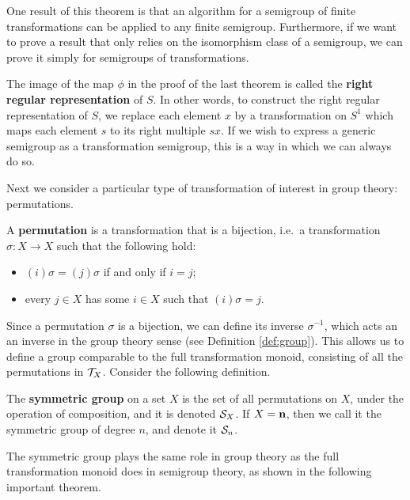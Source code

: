 One result of this theorem is that an algorithm for a semigroup of finite transformations
can be applied to any finite semigroup.  Furthermore, if we want to prove a result that
only relies on the isomorphism class of a semigroup, we can prove it simply for
semigroups of transformations.

The image of the map $\phi$ in the proof of the last theorem is called the
\textbf{right regular representation} of $S$.  In other words, to construct the
right regular representation of $S$, we replace each element $x$ by a
transformation on $S^1$ which maps each element $s$ to its right multiple $sx$.
If we wish to express a generic semigroup as a transformation semigroup, this is
a way in which we can always do so.

Next we consider a particular type of transformation of interest in group
theory: permutations.

\begin{definition}
  \label{def:permutation}
  A \textbf{permutation} is a transformation that is a bijection, i.e.~a
  transformation $\sigma: X \to X$ such that the following hold:
  \begin{itemize}
  \item $(i)\sigma=(j)\sigma$ if and only if $i=j$;
  \item every $j \in X$ has some $i \in X$ such that $(i)\sigma = j$.
  \end{itemize}
\end{definition}

Since a permutation $\sigma$ is a bijection, we can define its inverse
$\sigma^{-1}$, which acts an an inverse in the group theory sense (see
Definition \ref{def:group}).  This allows us to define a group comparable to the
full transformation monoid, consisting of all the permutations in $\mathcal{T}_X$.
Consider the following definition.

\begin{definition}
  \label{def:sn}
  The \textbf{symmetric group} on a set $X$ is the set of all permutations on
  $X$, under the operation of composition, and it is denoted $\mathcal{S}_X$.  If
  $X = \mathbf{n}$, then we call it the symmetric group of degree $n$, and denote it
  $\mathcal{S}_n$.
\end{definition}

The symmetric group plays the same role in group theory as the full
transformation monoid does in semigroup theory, as shown in the following
important theorem.

